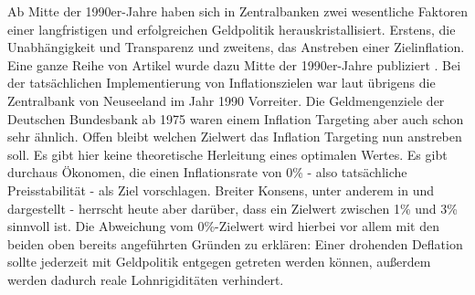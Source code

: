 Ab Mitte der 1990er-Jahre haben sich in Zentralbanken zwei wesentliche Faktoren einer langfristigen und erfolgreichen Geldpolitik herauskristallisiert. Erstens, die Unabhängigkeit und Transparenz und zweitens, das Anstreben einer Zielinflation. Eine ganze Reihe von Artikel wurde dazu Mitte der 1990er-Jahre publiziert \parencite{Alesina1993, Mishkin2000, Svensson2000, Bernanke1997}. Bei der tatsächlichen Implementierung von Inflationszielen war laut \textcite{Bernanke1999} übrigens die Zentralbank von Neuseeland im Jahr 1990 Vorreiter. Die Geldmengenziele der Deutschen Bundesbank ab 1975 waren einem Inflation Targeting aber auch schon sehr ähnlich. Offen bleibt welchen Zielwert das Inflation Targeting nun anstreben soll. Es gibt hier keine theoretische Herleitung eines optimalen Wertes. Es gibt durchaus Ökonomen, die einen Inflationsrate von 0\% - also tatsächliche Preisstabilität - als Ziel vorschlagen. Breiter Konsens, unter anderem in \textcite{Bernanke1999b} und \textcite{Akerlof1996} dargestellt - herrscht heute aber darüber, dass ein Zielwert zwischen 1\% und 3\% sinnvoll ist. Die Abweichung vom 0\%-Zielwert wird hierbei vor allem mit den beiden oben bereits angeführten Gründen zu erklären: Einer drohenden Deflation sollte jederzeit mit Geldpolitik entgegen getreten werden können, außerdem werden dadurch reale Lohnrigiditäten verhindert.


